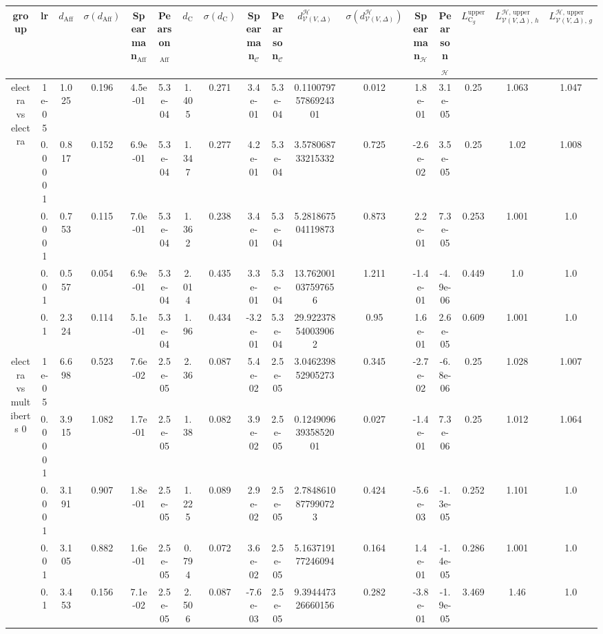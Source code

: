 \begin{tabular}{|c|c|c|c|c|c|c|c|c|c|c|c|c|c|c|c|c|}
\hline
group & lr & $d_{\mathrm{Aff}}$ & $\sigma(d_{\mathrm{Aff}})$ & Spearman$_{\mathrm{Aff}}$ & Pearson$_{\mathrm{Aff}}$ & $d_{\mathrm{C}}$ & $\sigma(d_{\mathrm{C}})$ & Spearman$_{\mathcal{C}}$ & Pearson$_{\mathcal{C}}$ & $d^\mathcal{H}_{\mathcal{V}(V,\Delta)}$ & $\sigma(d^\mathcal{H}_{\mathcal{V}(V,\Delta)})$ & Spearman$_{\mathcal{H}}$ & Pearson$_{\mathcal{H}}$ & $L_{\mathrm{C}_g}^{\mathrm{upper}}$ & $L^{\mathcal{H},\,\mathrm{upper}}_{\mathcal{V}(V,\Delta),\,h}$ & $L^{\mathcal{H},\,\mathrm{upper}}_{\mathcal{V}(V,\Delta),\,g}$ \\
\hline
\multirow{5}{*}{electra  vs electra } & 1e-05 & 1.025 & 0.196 & 4.5e-01 & 5.3e-04 & 1.405 & 0.271 & 3.4e-01 & 5.3e-04 & 0.11007975786924301 & 0.012 & 1.8e-01 & 3.1e-05 & 0.25 & 1.063 & 1.047 \\
 & 0.0001 & 0.817 & 0.152 & 6.9e-01 & 5.3e-04 & 1.347 & 0.277 & 4.2e-01 & 5.3e-04 & 3.578068733215332 & 0.725 & -2.6e-02 & 3.5e-05 & 0.25 & 1.02 & 1.008 \\
 & 0.001 & 0.753 & 0.115 & 7.0e-01 & 5.3e-04 & 1.362 & 0.238 & 3.4e-01 & 5.3e-04 & 5.281867504119873 & 0.873 & 2.2e-01 & 7.3e-05 & 0.253 & 1.001 & 1.0 \\
 & 0.01 & 0.557 & 0.054 & 6.9e-01 & 5.3e-04 & 2.014 & 0.435 & 3.3e-01 & 5.3e-04 & 13.762001037597656 & 1.211 & -1.4e-01 & -4.9e-06 & 0.449 & 1.0 & 1.0 \\
 & 0.1 & 2.324 & 0.114 & 5.1e-01 & 5.3e-04 & 1.96 & 0.434 & -3.2e-01 & 5.3e-04 & 29.922378540039062 & 0.95 & 1.6e-01 & 2.6e-05 & 0.609 & 1.001 & 1.0 \\
\hline
\multirow{5}{*}{electra  vs multiberts 0} & 1e-05 & 6.698 & 0.523 & 7.6e-02 & 2.5e-05 & 2.36 & 0.087 & 5.4e-02 & 2.5e-05 & 3.046239852905273 & 0.345 & -2.7e-02 & -6.8e-06 & 0.25 & 1.028 & 1.007 \\
 & 0.0001 & 3.915 & 1.082 & 1.7e-01 & 2.5e-05 & 1.38 & 0.082 & 3.9e-02 & 2.5e-05 & 0.12490963935852001 & 0.027 & -1.4e-01 & 7.3e-06 & 0.25 & 1.012 & 1.064 \\
 & 0.001 & 3.191 & 0.907 & 1.8e-01 & 2.5e-05 & 1.225 & 0.089 & 2.9e-02 & 2.5e-05 & 2.7848610877990723 & 0.424 & -5.6e-03 & -1.3e-05 & 0.252 & 1.101 & 1.0 \\
 & 0.01 & 3.105 & 0.882 & 1.6e-01 & 2.5e-05 & 0.794 & 0.072 & 3.6e-02 & 2.5e-05 & 5.163719177246094 & 0.164 & 1.4e-01 & -1.4e-05 & 0.286 & 1.001 & 1.0 \\
 & 0.1 & 3.453 & 0.156 & 7.1e-02 & 2.5e-05 & 2.506 & 0.087 & -7.6e-03 & 2.5e-05 & 9.394447326660156 & 0.282 & -3.8e-01 & -1.9e-05 & 3.469 & 1.46 & 1.0 \\

\end{tabular}
